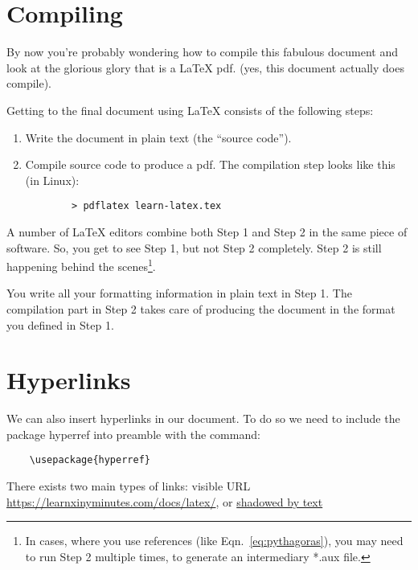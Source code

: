 \documentclass[12pt]{article}
\begin{document}
\section{Compiling}

By now you're probably wondering how to compile this fabulous document
and look at the glorious glory that is a \LaTeX{} pdf.
(yes, this document actually does compile).

Getting to the final document using \LaTeX{} consists of the following
steps:
  \begin{enumerate}
    \item Write the document in plain text (the ``source code'').
    \item Compile source code to produce a pdf.
     The compilation step looks like this (in Linux): \\
     \begin{verbatim}
        > pdflatex learn-latex.tex
     \end{verbatim}
  \end{enumerate}

A number of \LaTeX{} editors combine both Step 1 and Step 2 in the
same piece of software. So, you get to see Step 1, but not Step 2 completely.
Step 2 is still happening behind the scenes\footnote{In cases, where you use
references (like Eqn.~\ref{eq:pythagoras}), you may need to run Step 2
multiple times, to generate an intermediary *.aux file.}.

You write all your formatting information in plain text in Step 1.
The compilation part in Step 2 takes care of producing the document in the
format you defined in Step 1.

\section{Hyperlinks}
We can also insert hyperlinks in our document. To do so we need to include the
package hyperref into preamble with the command:
\begin{verbatim}
    \usepackage{hyperref}
\end{verbatim}

There exists two main types of links: visible URL \\
\url{https://learnxinyminutes.com/docs/latex/}, or
\href{https://learnxinyminutes.com/docs/latex/}{shadowed by text}
\end{document}
